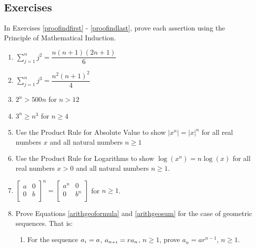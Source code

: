 \newpage

\subsection{Exercises}

In Exercises \ref{proofindfirst} - \ref{proofindlast}, prove each assertion using the Principle of Mathematical Induction.

\begin{enumerate}

\item  $\displaystyle{ \sum_{j=1}^{n} j^2 = \dfrac{n(n+1)(2n+1)}{6}}$ \label{proofindfirst}

\item  $\displaystyle{ \sum_{j=1}^{n} j^3 = \dfrac{n^2(n+1)^2}{4}}$

\item  $2^{n} > 500 n$ for $n > 12$

\item  $3^{n} \geq n^3$ for $n \geq 4$

\item  Use the Product Rule for Absolute Value to show  $\left|x^{n}\right| = |x|^{n}$ for all real numbers $x$ and all natural numbers $n \geq 1$

\item  Use the Product Rule for Logarithms to show $\log\left(x^{n}\right) = n \log(x)$ for all real numbers $x > 0$ and all natural numbers $n \geq 1$.

\item  $\left[ \begin{array}{cc} a & 0 \\ 0 & b \\ \end{array} \right]^{n} = \left[ \begin{array}{cc} a^{n} & 0 \\ 0 & b^{n} \\ \end{array} \right]$ for $n \geq 1$. \label{proofindlast}


\item  Prove Equations \ref{arithgeoformula} and \ref{arithgeosum} for the case of geometric sequences.  That is:

\begin{enumerate}

\item  For the sequence  $a_{\mbox{\tiny $1$}} = a$, $a_{n\mbox{\tiny{$+1$}}} = r a_{n}$, $n \geq 1$, prove $a_{n} = ar^{n-1}$, $n \geq 1$.


\end{enumerate}
\end{enumerate}
